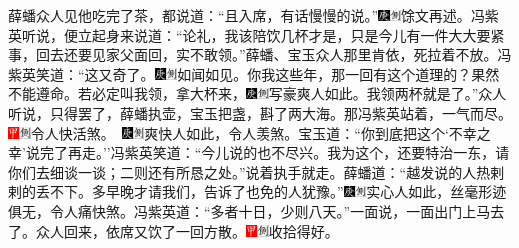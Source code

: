 薛蟠众人见他吃完了茶，都说道：``且入席，有话慢慢的说。''{\includegraphics[width=3mm]{../Images/00004}\includegraphics[width=3mm]{../Images/00011}\footnotesize \kaishu 馀文再述。}冯紫英听说，便立起身来说道：``论礼，我该陪饮几杯才是，只是今儿有一件大大要紧事，回去还要见家父面回，实不敢领。''薛蟠、宝玉众人那里肯依，死拉着不放。冯紫英笑道：``这又奇了。{\includegraphics[width=3mm]{../Images/00004}\includegraphics[width=3mm]{../Images/00011}\footnotesize \kaishu 如闻如见。}你我这些年，那一回有这个道理的？果然不能遵命。若必定叫我领，拿大杯来，{\includegraphics[width=3mm]{../Images/00004}\includegraphics[width=3mm]{../Images/00011}\footnotesize \kaishu 写豪爽人如此。}我领两杯就是了。''众人听说，只得罢了，薛蟠执壶，宝玉把盏，斟了两大海。那冯紫英站着，一气而尽。{\includegraphics[width=3mm]{../Images/00002}\includegraphics[width=3mm]{../Images/00011}\footnotesize \kaishu 令人快活煞。　\includegraphics[width=3mm]{../Images/00004}\includegraphics[width=3mm]{../Images/00011}\footnotesize \kaishu 爽快人如此，令人羡煞。}宝玉道：``你到底把这个`不幸之幸'说完了再走。''冯紫英笑道：``今儿说的也不尽兴。我为这个，还要特治一东，请你们去细谈一谈；二则还有所恳之处。''说着执手就走。薛蟠道：``越发说的人热剌剌的丢不下。多早晚才请我们，告诉了也免的人犹豫。''{\includegraphics[width=3mm]{../Images/00004}\includegraphics[width=3mm]{../Images/00011}\footnotesize \kaishu 实心人如此，丝毫形迹俱无，令人痛快煞。}冯紫英道：``多者十日，少则八天。''一面说，一面出门上马去了。众人回来，依席又饮了一回方散。{\includegraphics[width=3mm]{../Images/00002}\includegraphics[width=3mm]{../Images/00011}\footnotesize \kaishu 收拾得好。}

